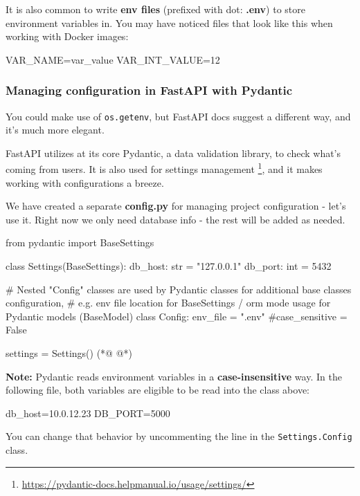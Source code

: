 \documentclass[14pt]{extarticle}
\newcommand{\flink}[1]{\footnote{\href{#1}{#1}}}
\newcommand{\note}{\textbf{\color{red}Note: }}
\newcommand{\pyinline}[1]{\lstinline[language=Python, style=cstyle, morekeywords={async}, basicstyle=\ttfamily\normalsize]{#1}}
\begin{document}
It is also common to write \textbf{env files} (prefixed with dot: \textbf{.env}) to store environment variables in. You may have noticed files that look like this when working with Docker images:

\begin{bashcode}
    VAR_NAME=var_value
    VAR_INT_VALUE=12
\end{bashcode}

\subsubsection{Managing configuration in FastAPI with Pydantic}

You could make use of \pyinline{os.getenv}, but FastAPI docs suggest a different way, and it's much more elegant.

FastAPI utilizes at its core Pydantic, a data validation library, to check what's coming from users. It is also used for settings management \flink{https://pydantic-docs.helpmanual.io/usage/settings/}, and it makes working with configurations a breeze.

We have created a separate \textbf{config.py} for managing project configuration - let's use it. Right now we only need database info - the rest will be added as needed.

\begin{pycode}
    from pydantic import BaseSettings


    class Settings(BaseSettings):
        db_host: str = "127.0.0.1"
        db_port: int = 5432

        # Nested "Config" classes are used by Pydantic classes for additional base classes configuration,
        # e.g. env file location for BaseSettings / orm mode usage for Pydantic models (BaseModel)
        class Config:
            env_file = ".env"
            #case_sensitive = False

    settings = Settings() (*@ \label{config.py1:si} @*)
\end{pycode}

\note Pydantic reads environment variables in a \textbf{case-insensitive} way. In the following file, both variables are eligible to be read into the class above:

\begin{bashcode}
    db_host=10.0.12.23
    DB_PORT=5000
\end{bashcode}

You can change that behavior by uncommenting the line in the \pyinline{Settings.Config} class.
\end{document}
